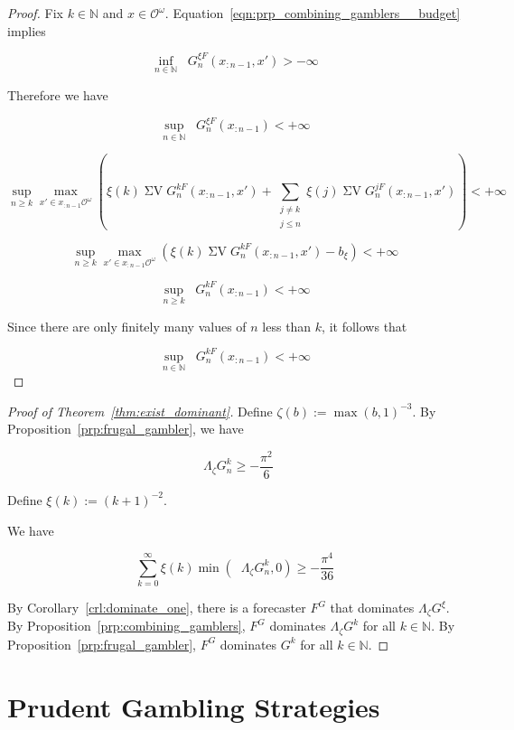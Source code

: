 \documentclass[aop,preprint]{imsart}
\numberwithin{equation}{section}
\theoremstyle{definition}
\theoremstyle{plain}
\newcommand{\Nats}{\mathbb{N}}
\newcommand{\Ob}{\mathcal{O}}
\newcommand{\OO}{\Ob^\omega}
\DeclareMathOperator{\SV}{\Sigma V}
\DeclareMathOperator{\SVM}{\Sigma V_{\min}}
\DeclareMathOperator{\SVX}{\Sigma V_{\max}}
\newcommand{\Bd}{\Lambda}
\begin{document}
\begin{proof}

Fix $k \in \Nats$ and $x \in \OO$. Equation~\ref{eqn:prp_combining_gamblers__budget} implies

\[\inf_{n \in \Nats} \SVM G^{\xi F}_{n}\left(x_{:n-1},x'\right) > -\infty\]

Therefore we have

\[\sup_{n \in \Nats} \SVX G^{\xi F}_{n}\left(x_{:n-1}\right) < +\infty\]

\[\sup_{n \geq k} \max_{x' \in x_{:n-1}\OO} \left(\xi\left(k\right) \SV G^{k F}_{n}\left(x_{:n-1},x'\right) + \sum_{\substack{j \ne k\\ j \leq n}} \xi\left(j\right) \SV G^{j F}_{n}\left(x_{:n-1},x'\right)\right) < +\infty\]

\[\sup_{n \geq k} \max_{x' \in x_{:n-1}\OO} \left(\xi\left(k\right) \SV G^{k F}_{n}\left(x_{:n-1},x'\right) - b_\xi\right) < +\infty\]

\[\sup_{n \geq k} \SVX G^{k F}_{n}\left(x_{:n-1}\right) < +\infty\]

Since there are only finitely many values of $n$ less than $k$, it follows that

\[\sup_{n \in \Nats} \SVX G^{k F}_{n}\left(x_{:n-1}\right) < +\infty\]
\end{proof}

\begin{proof}[Proof of Theorem~\ref{thm:exist_dominant}]

Define $\zeta\left(b\right) := \max\left(b,1\right)^{-3}$. By Proposition~\ref{prp:frugal_gambler}, we have

\[\SVM \Bd_{\zeta} G^k_n \geq -\frac{\pi^2}{6}\]

Define $\xi\left(k\right):=\left(k+1\right)^{-2}$.

We have

\[\sum_{k=0}^\infty \xi\left(k\right) \min\left(\SVM \Bd_{\zeta} G^k_n, 0\right) \geq -\frac{\pi^4}{36} \]

By Corollary~\ref{crl:dominate_one}, there is a forecaster $F^G$ that dominates $\Bd_\zeta G^\xi$. By Proposition~\ref{prp:combining_gamblers}, $F^G$ dominates $\Bd_\zeta G^k$ for all $k \in \Nats$. By Proposition~\ref{prp:frugal_gambler}, $F^G$ dominates $G^k$ for all $k \in \Nats$.
\end{proof}

\section{Prudent Gambling Strategies}
\label{sec:prudent}
\end{document}
